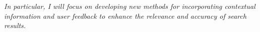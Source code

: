 \textit{In particular, I will focus on developing new methods for incorporating contextual information and user feedback to enhance the relevance and accuracy of search results.}



